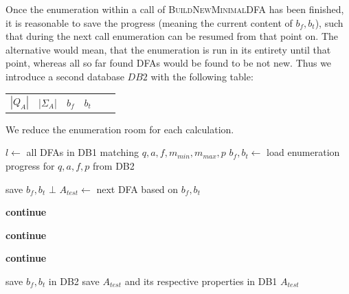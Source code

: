 
Once the enumeration within a call of \textsc{BuildNewMinimalDFA} has been finished, it is reasonable to save the progress (meaning the current content of $b_f, b_t$), such that during the next call enumeration can be resumed from that point on. The alternative would mean, that the enumeration is run in its entirety until that point, whereas all so far found DFAs would be found to be not new. Thus we introduce a second database $DB2$ with the following table:
\begin{center}
	\begin{tabular}{c c c c c c}
		$|Q_A|$ & |$\Sigma_A$| & $b_f$ & $b_t$
	\end{tabular}
\end{center}
We reduce the enumeration room for each calculation.
\vspace{0.2cm}
\begin{algorithmic}[1]
	
		\vspace{0.2cm}
	
		\State $l \gets$ all DFAs in DB1 matching $q, a, f, m_{min}, m_{max}, p$
		\State $b_f, b_t \gets$ load enumeration progress for $q, a, f, p$ from DB2
		
		\vspace{0.2cm}
		
		
			\vspace{0.2cm}
		
				\State save $b_f, b_t$
				\State\Return $\bot$
			\EndIf
			\State $A_{test} \gets$ next DFA based on $b_f, b_t$
			
			\vspace{0.2cm}
			
				\State \textbf{continue}
			\EndIf
			
				\State \textbf{continue}
			\EndIf
			
				\State \textbf{continue}
			\EndIf
			
			\vspace{0.2cm}
			
			\State save $b_f, b_t$ in DB2
			\State save $A_{test}$ and its respective properties in DB1
			\State\Return $A_{test}$
		\EndWhile
	\EndFunction
\end{algorithmic}
\vspace{0.2cm}

